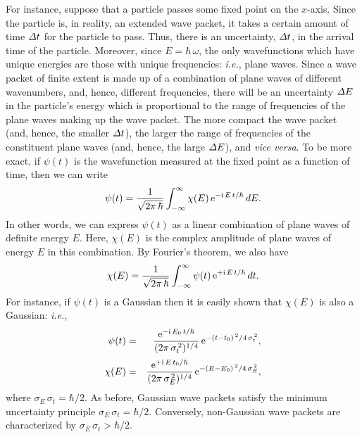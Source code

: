 For instance, suppose that a particle passes some fixed point on the $x$-axis.
Since the particle is, in reality, an extended wave packet, it takes a certain amount
of time ${\mit\Delta}t$ for the particle to pass. Thus, there is an uncertainty,
${\mit\Delta}t$, in the arrival time of the particle. Moreover, since
$E=\hbar\,\omega$, the only wavefunctions which have unique energies
are those with unique frequencies: {\em i.e.}, plane waves. Since a
wave packet of finite extent is made up of a combination of plane waves
of different wavenumbers, and, hence, different frequencies, there will
be an uncertainty ${\mit\Delta}E$ in the particle's energy which is
proportional to the range of frequencies of the plane waves making up the
wave packet. The more compact the wave packet (and, hence, the
smaller ${\mit\Delta}t$), the larger the range of frequencies of the constituent plane waves (and, hence, the large ${\mit\Delta}E$), and
{\em vice versa}. To be more exact, if $\psi(t)$ is the wavefunction
measured at the fixed point as a function of time, then we can write
\begin{equation}
\psi(t)= \frac{1}{\sqrt{2\pi\,\hbar}}\int_{-\infty}^{\infty}\chi(E)\,{\rm e}^{-{\rm i}\,E\,t/\hbar}\,dE.
\end{equation}
In other words, we can express $\psi(t)$ as a linear combination of
plane waves of definite energy $E$. Here, $\chi(E)$ is the complex
amplitude of plane waves of energy $E$ in this combination. By Fourier's
theorem, we also have
\begin{equation}
\chi(E) = \frac{1}{\sqrt{2\pi\,\hbar}}\int_{-\infty}^{\infty}\psi(t)\,{\rm e}^{+{\rm i}\,E\,t/\hbar}\,dt.
\end{equation}
For instance, if $\psi(t)$ is a Gaussian then it is easily shown that
$\chi(E)$ is also a Gaussian: {\em i.e.}, 
\begin{eqnarray}
\psi(t) &=& \frac{{\rm e}^{-{\rm i}\,E_0\,t/\hbar}}{(2\pi\,\sigma_t^{\,2})^{1/4}}\,{\rm e}^{-(t-t_0)^{\,2}/4\,\sigma_t^{\,2}},\\[0.5ex]
\chi(E) &=&\frac{{\rm e}^{+{\rm i}\,E\,t_0/\hbar}}{(2\pi\,\sigma_E^{\,2})^{1/4}}\,{\rm e}^{-(E-E_0)^{\,2}/4\,\sigma_E^{\,2}},
\end{eqnarray}
where $\sigma_E\,\sigma_t=\hbar/2$. As before, Gaussian wave packets
satisfy the minimum uncertainty principle $\sigma_E\,\sigma_t=\hbar/2$. Conversely, non-Gaussian wave packets
are characterized by $\sigma_E\,\sigma_t>\hbar/2$.

